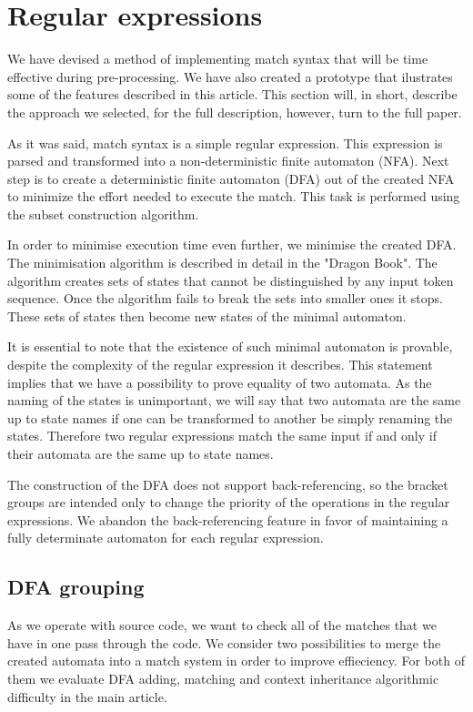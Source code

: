 \section{\label{sec:regexps}Regular expressions}

We have devised a method of implementing match syntax that will be time
effective during pre-processing. We have also created a prototype that
ilustrates some of the features described in this article. This section will,
in short, describe the approach we selected, for the full description, however,
turn to the full paper.

As it was said, match syntax is a simple regular expression. This expression is
parsed and transformed into a non-deterministic finite automaton (NFA). Next
step is to create a deterministic finite automaton (DFA) out of the created NFA
to minimize the effort needed to execute the match. This task is performed
using the subset construction algorithm.

In order to minimise execution time even further, we minimise the created DFA.
The minimisation algorithm is described in detail in the "Dragon Book". The
algorithm creates sets of states that cannot be distinguished by any input
token sequence. Once the algorithm fails to break the sets into smaller ones
it stops. These sets of states then become new states of the minimal automaton.

It is essential to note that the existence of such minimal automaton is
provable, despite the complexity of the regular expression it describes. This
statement implies that we have a possibility to prove equality of two automata.
As the naming of the states is unimportant, we will say that two automata are
the same up to state names if one can be transformed to another be simply
renaming the states. Therefore two regular expressions match the same input if
and only if their automata are the same up to state names.

The construction of the DFA does not support back-referencing, so the bracket
groups are intended only to change the priority of the operations in the
regular expressions. We abandon the back-referencing feature in favor of
maintaining a fully determinate automaton for each regular expression.

\subsection{DFA grouping}
As we operate with source code, we want to check all of the matches that we
have in one pass through the code. We consider two possibilities to merge the
created automata into a match system in order to improve effieciency. For both
of them we evaluate DFA adding, matching and context inheritance algorithmic
difficulty in the main article.

